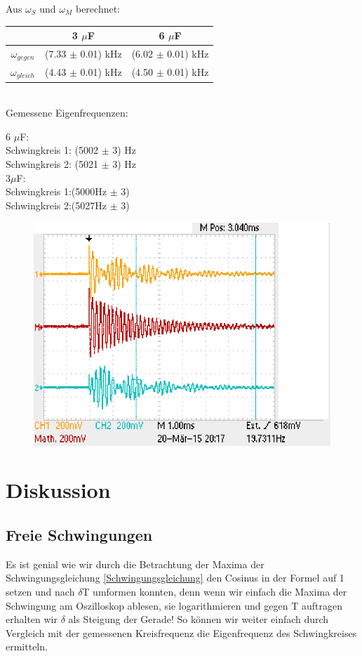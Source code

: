 \documentclass{article}
\begin{document}
Aus $\omega_S$ und $\omega_M$ berechnet:
\begin{tabular}{c|c|c}
&3 $\mu$F & 6 $\mu$F\\
\hline $\omega_{gegen}$ & (7.33 $\pm$ 0.01) kHz & (6.02 $\pm$ 0.01) kHz \\
$\omega_{gleich}$ & (4.43 $\pm$ 0.01) kHz & (4.50 $\pm$ 0.01) kHz \\
\end{tabular}\\
Gemessene Eigenfrequenzen:\\
\begin{center}
6 $\mu$F:\\
Schwingkreis 1:
(5002 $\pm$ 3) Hz\\
Schwingkreis 2:
(5021 $\pm$ 3) Hz\\
\vspace{0.5cm}
3$\mu$F:\\
Schwingkreis 1:(5000Hz $\pm$ 3)\\
Schwingkreis 2:(5027Hz $\pm$ 3)
\end{center}
\begin{center}
\begin{figure}
\includegraphics[width=0.5\linewidth]{reso.eps}
\end{figure}
\end{center}
\section{Diskussion}
\subsection{Freie Schwingungen}
Es ist genial wie wir durch die Betrachtung der Maxima der Schwingungsgleichung \ref{Schwingungsgleichung} den Cosinus in der Formel auf 1 setzen und nach $\delta$T umformen konnten, denn wenn wir einfach die Maxima der Schwingung am Oszilloskop ablesen, sie logarithmieren und gegen T auftragen erhalten wir $\delta$ als Steigung der Gerade! So können wir weiter einfach durch Vergleich mit der gemessenen Kreisfrequenz die Eigenfrequenz des Schwingkreises ermitteln. \\
\end{document}
